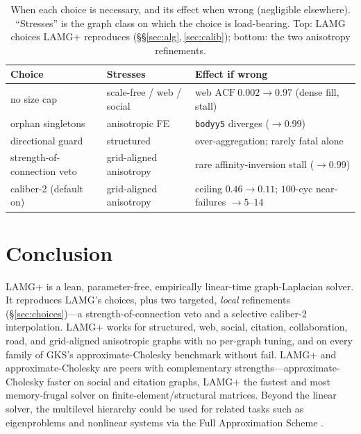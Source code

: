 \documentclass[leqno,letterpaper]{etna}
\newcommand{\acf}{\mathrm{ACF}}
\begin{document}
\begin{table}[t]\centering\footnotesize\setlength{\tabcolsep}{4pt}
\caption{When each choice is necessary, and its effect when wrong (negligible elsewhere).
``Stresses'' is the graph class on which the choice is load-bearing. Top: LAMG choices LAMG+
reproduces (\S\S\ref{sec:alg},\,\ref{sec:calib}); bottom: the two anisotropy refinements.}\label{tab:ablate}
\begin{tabular}{>{\raggedright\arraybackslash}p{2.9cm}
               >{\raggedright\arraybackslash}p{2.9cm}
               >{\raggedright\arraybackslash}p{5.0cm}}
\toprule
Choice & Stresses & Effect if wrong\\
\midrule
no size cap & scale-free / web / social & web $\acf\ 0.002\!\to\!0.97$ (dense fill, stall)\\
orphan singletons & anisotropic FE & \texttt{bodyy5} diverges ($\to0.99$)\\
directional guard & structured & over-aggregation; rarely fatal alone\\
\midrule
strength-of-connection veto & grid-aligned anisotropy & rare affinity-inversion stall ($\to0.99$)\\
caliber-2 (default on) & grid-aligned anisotropy & ceiling $0.46\!\to\!0.11$; $100$-cyc near-failures $\to5$--$14$\\
\bottomrule
\end{tabular}
\end{table}

\section{Conclusion}\label{sec:conclusion}
LAMG+ is a lean, parameter-free, empirically linear-time graph-Laplacian solver. It reproduces LAMG's choices, plus two targeted, \emph{local} refinements (\S\ref{sec:choices})---a
strength-of-connection veto and a selective caliber-2 interpolation. LAMG+ works for structured, web, social, citation, collaboration, road, and
grid-aligned anisotropic graphs with no per-graph tuning, and on every family of GKS's
approximate-Cholesky benchmark \cite{gks2023} without fail. LAMG+ and approximate-Cholesky are peers with complementary strengths---approximate-Cholesky faster on
social and citation graphs, LAMG+ the fastest and most memory-frugal solver on
finite-element/structural matrices. Beyond the linear solver, the multilevel hierarchy could be used
for related tasks such as eigenproblems \cite[\S6.4]{lamg} and nonlinear systems via the Full
Approximation Scheme \cite[\S8.1]{guide}.
\end{document}
